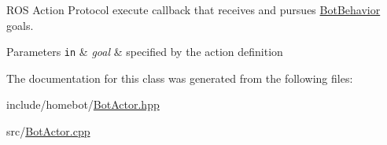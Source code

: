 R\-O\-S Action Protocol execute callback that receives and pursues \hyperlink{classBotBehavior}{Bot\-Behavior} goals. 


\begin{DoxyParams}[1]{Parameters}
\mbox{\tt in}  & {\em goal} & specified by the action definition \\
\hline
\end{DoxyParams}


The documentation for this class was generated from the following files\-:\begin{DoxyCompactItemize}
\item 
include/homebot/\hyperlink{BotActor_8hpp}{Bot\-Actor.\-hpp}\item 
src/\hyperlink{BotActor_8cpp}{Bot\-Actor.\-cpp}\end{DoxyCompactItemize}
